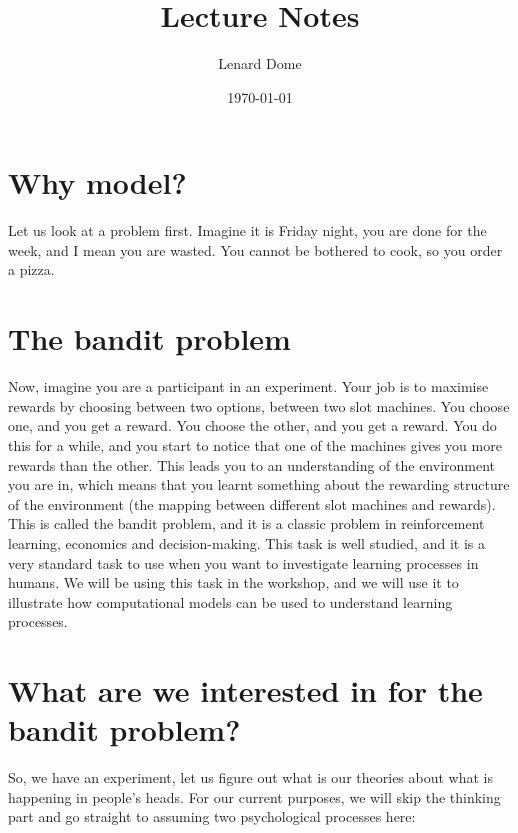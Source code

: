 \documentclass[12pt]{article}
\title{Lecture Notes}
\author{Lenard Dome}
\date{\today}
\begin{document}
\maketitle

\tableofcontents
\newpage

\section{Why model?}

Let us look at a problem first. Imagine it is Friday night, you are done for the week, and I mean you are wasted. You cannot be bothered to cook, so you order a pizza. 

\section{The bandit problem}

Now, imagine you are a participant in an experiment. Your job is to maximise rewards by choosing between two options, between two slot machines. You choose one, and you get a reward. You choose the other, and you get a reward. You do this for a while, and you start to notice that one of the machines gives you more rewards than the other. This leads you to an understanding of the environment you are in, which means that you learnt something about the rewarding structure of the environment (the mapping between different slot machines and rewards). This is called the bandit problem, and it is a classic problem in reinforcement learning, economics and decision-making. This task is well studied, and it is a very standard task to use when you want to investigate learning processes in humans. We will be using this task in the workshop, and we will use it to illustrate how computational models can be used to understand learning processes.

\section{What are we interested in for the bandit problem?}

So, we have an experiment, let us figure out what is our theories about what is happening in people's heads. For our current purposes, we will skip the thinking part and go straight to assuming two psychological processes here:
\end{document}
